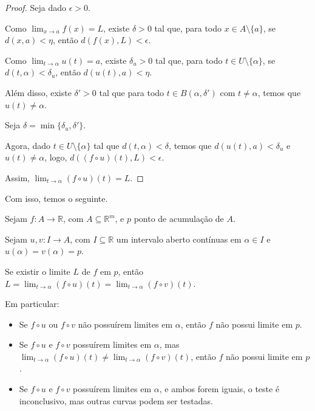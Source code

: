 \begin{proof}
    Seja dado $\epsilon>0$.

    Como $\lim_{x\to a} f(x) = L$, existe $\delta>0$ tal que, para todo $x \in A\setminus\{a\}$, se $d(x, a) < \eta$, então $d(f(x), L) < \epsilon$.

    Como $\lim_{t\to \alpha} u(t) = a$, existe $\delta_u>0$ tal que, para todo $t \in U\setminus\{\alpha\}$, se $d(t, \alpha) < \delta_u$, então $d(u(t), a) < \eta$.

   Além disso, existe $\delta'>0$ tal que para todo $t \in B(\alpha, \delta')$ com $t\neq \alpha$, temos que $u(t)\neq \alpha$.

    Seja $\delta = \min\{\delta_u, \delta'\}$.

    Agora, dado $t \in U\setminus\{\alpha\}$ tal que $d(t, \alpha) < \delta$, temos que $d(u(t), a) < \delta_u$ e $u(t)\neq \alpha$, logo, $d((f\circ u)(t), L) < \epsilon$.

    Assim, $\lim_{t\to \alpha} (f\circ u)(t) = L$.
\end{proof}

Com isso, temos o seguinte.

\begin{corollary}
    Sejam $f: A \rightarrow \mathbb R$, com $A\subseteq \mathbb R^m$, e $p$ ponto de acumulação de $A$.

    Sejam $u, v: I\rightarrow A$, com $I\subseteq \mathbb R$ um intervalo aberto contínuas em $\alpha \in I$ e $u(\alpha) = v(\alpha) = p$.

    Se existir o limite $L$ de $f$ em $p$, então $L=\lim_{t\to \alpha} (f\circ u)(t) = \lim_{t\to \alpha} (f\circ v)(t)$.

    Em particular:

    \begin{itemize}
        \item Se $f\circ u$ ou $f\circ v$ não possuírem limites em $\alpha$, então $f$ não possui limite em $p$.
        \item Se $f\circ u$ e $f\circ v$ possuírem limites em $\alpha$, mas $\lim_{t\to \alpha} (f\circ u)(t) \neq \lim_{t\to \alpha} (f\circ v)(t)$, então $f$ não possui limite em $p$.
        \item Se $f\circ u$ e $f\circ v$ possuírem limites em $\alpha$, e ambos forem iguais, o teste é inconclusivo, mas outras curvas podem ser testadas.
    \end{itemize}
\end{corollary}

